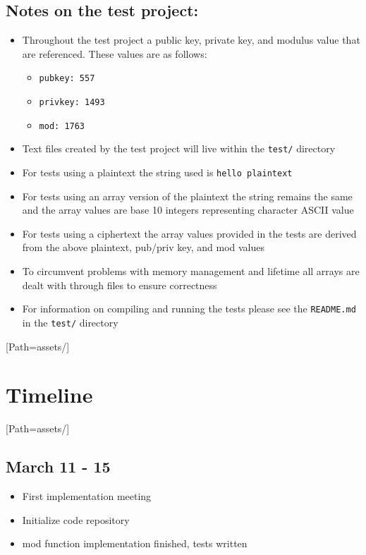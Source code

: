 \documentclass{article}
\begin{document}
    \subsection{Notes on the test project:}
    \begin{itemize}
        \item Throughout the test project a public key, private key, and modulus value that are referenced. These values are as follows:
        \begin{itemize}
            \item \verb|pubkey: 557|
            \item \verb|privkey: 1493|
            \item \verb|mod: 1763|
        \end{itemize}
        \item Text files created by the test project will live within the \verb|test/| directory
        \item For tests using a plaintext the string used is \verb|hello plaintext|
        \item For tests using an array version of the plaintext the string remains the same and the array values are base 10 integers representing character ASCII value
        \item For tests using a ciphertext the array values provided in the tests are derived from the above plaintext, pub/priv key, and mod values
        \item To circumvent problems with memory management and lifetime all arrays are dealt with through files to ensure correctness
        \item For information on compiling and running the tests please see the \verb|README.md| in the \verb|test/| directory
    \end{itemize}
    
\newpage

\setmainfont{OpenSans-VariableFont_wdth,wght.ttf}[Path=assets/]
\section{Timeline}
\setmainfont{OpenSans-VariableFont_wdth,wght.ttf}[Path=assets/]
    \subsection{March 11 - 15}
        \begin{itemize}
            \item First implementation meeting
            \item Initialize code repository
            \item mod function implementation finished, tests written
        \end{itemize}
\end{document}
